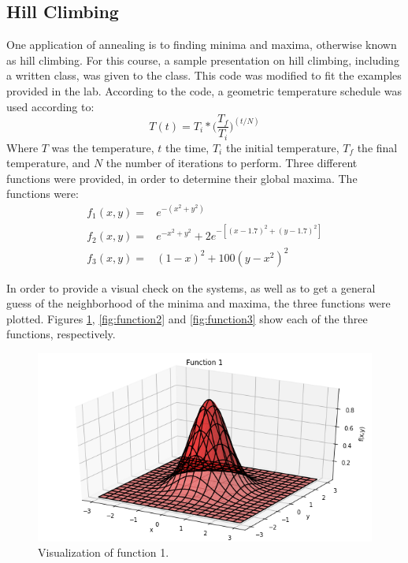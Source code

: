 \documentclass[twocolumn]{article}
\begin{document}
\subsection{Hill Climbing}
One application of annealing is to finding minima and maxima, otherwise known as hill climbing. For this course, a sample presentation on hill climbing, including a written class, was given to the class. This code was modified to fit the examples provided in the lab. According to the code, a geometric temperature schedule was used according to:
\begin{equation}
T(t) = T_i * \bigg( \frac{T_f}{T_i} \bigg)^{(t/N)}
\end{equation}
 Where $T$ was the temperature, $t$ the time, $T_i$ the initial temperature, $T_f$ the final temperature, and $N$ the number of iterations to perform. Three different functions were provided, in order to determine their global maxima. The functions were:
\begin{equation}
\begin{split}
f_1(x,y) =& e^{-(x^2+y^2)} \\
f_2(x,y) =& e^{-x^2+y^2} + 2e^{-[(x-1.7)^2 + (y-1.7)^2]} \\
f_3(x,y) =& (1-x)^2 + 100(y-x^2)^2
\end{split}
\end{equation}

In order to provide a visual check on the systems, as well as to get a general guess of the neighborhood of the minima and maxima, the three functions were plotted. Figures \ref{fig:function1}, \ref{fig:function2} and \ref{fig:function3} show each of the three functions, respectively.

\begin{figure}
\centering
\includegraphics[width=\linewidth]{"function 1"}
\caption{Visualization of function 1.}
\label{fig:function1}
\end{figure}
\end{document}
